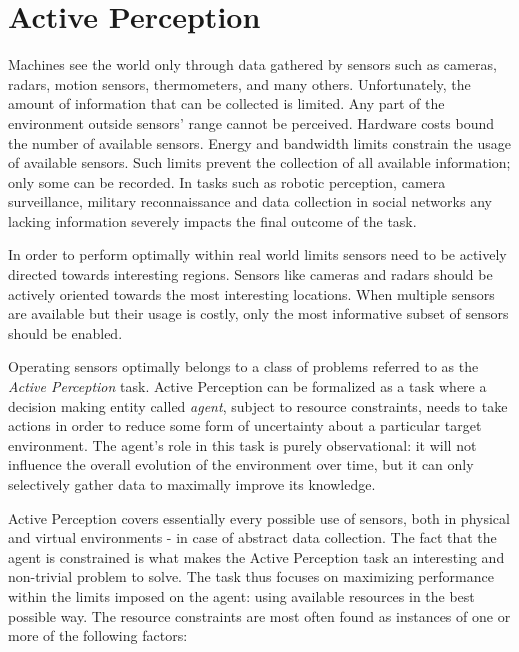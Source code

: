 \section{Active Perception}

Machines see the world only through data gathered by sensors such as cameras, radars, motion
sensors, thermometers, and many others. Unfortunately, the amount of information that can be
collected is limited. Any part of the environment outside sensors' range cannot be perceived.
Hardware costs bound the number of available sensors. Energy and bandwidth limits constrain the
usage of available sensors. Such limits prevent the collection of all available information; only
some can be recorded. In tasks such as robotic perception, camera surveillance, military
reconnaissance and data collection in social networks any lacking information severely impacts the
final outcome of the task.

In order to perform optimally within real world limits sensors need to be actively directed towards
interesting regions. Sensors like cameras and radars should be actively oriented towards the most
interesting locations. When multiple sensors are available but their usage is costly, only the most
informative subset of sensors should be enabled.

Operating sensors optimally belongs to a class of problems referred to as the \textit{Active
Perception} task.  Active Perception can be formalized as a task where a decision making entity
called \textit{agent}, subject to resource constraints, needs to take actions in order to reduce
some form of uncertainty about a particular target environment. The agent's role in this task is
purely observational: it will not influence the overall evolution of the environment over time, but
it can only selectively gather data to maximally improve its knowledge.

Active Perception covers essentially every possible use of sensors, both in physical and virtual
environments - in case of abstract data collection. The fact that the agent is constrained is what
makes the Active Perception task an interesting and non-trivial problem to solve. The task thus
focuses on maximizing performance within the limits imposed on the agent: using available resources
in the best possible way. The resource constraints are most often found as instances of one or more
of the following factors:


